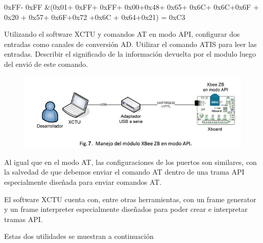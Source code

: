 \documentclass[11pt,oneside,spanish,a4paper]{article}
\begin{document}
0xFF- 0xFF \&(0x01+ 0xFF+ 0xFF+ 0x00+0x48+
0x65+ 0x6C+ 0x6C+0x6F + 0x20 +
0x57+ 0x6F+0x72 +0x6C + 0x64+0x21) = 0xC3


Utilizando el software XCTU y comandos AT en modo API, configurar dos entradas como canales de conversión AD. Utilizar el comando ATIS para leer las entradas. Describir el significado de la información devuelta por el modulo luego del envió de este comando.
\begin{figure}[ht]
	\centering
	\includegraphics[width=.6\textwidth]{img/IMAGEN07.jpg}
\end{figure}
Al igual que en el modo AT, las configuraciones de los puertos son similares, con la salvedad de que debemos enviar el comando AT dentro de una trama API especialmente diseñada para enviar comandos AT.

El software XCTU cuenta con, entre otras herramientas, con un frame generator y un frame interpreter especialmente diseñados para poder crear e interpretar tramas API.

Estas dos utilidades se muestran a continuación
\end{document}
